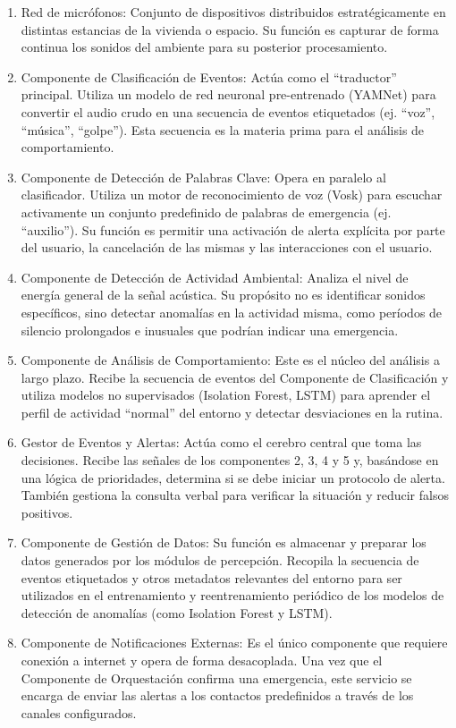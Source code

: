 \begin{enumerate}
      \item Red de micrófonos: Conjunto de dispositivos distribuidos estratégicamente en distintas estancias de la vivienda o espacio. Su función es capturar de forma continua los sonidos del ambiente para su posterior procesamiento.
      \item Componente de Clasificación de Eventos: Actúa como el ``traductor'' principal. Utiliza un modelo de red neuronal pre-entrenado (YAMNet) para convertir el audio crudo en una secuencia de eventos etiquetados (ej. ``voz'', ``música'', ``golpe''). Esta secuencia es la materia prima para el análisis de comportamiento.
      \item Componente de Detección de Palabras Clave: Opera en paralelo al clasificador. Utiliza un motor de reconocimiento de voz (Vosk) para escuchar activamente un conjunto predefinido de palabras de emergencia (ej. ``auxilio''). Su función es permitir una activación de alerta explícita por parte del usuario, la cancelación de las mismas y las interacciones con el usuario.
      \item Componente de Detección de Actividad Ambiental: Analiza el nivel de energía general de la señal acústica. Su propósito no es identificar sonidos específicos, sino detectar anomalías en la actividad misma, como períodos de silencio prolongados e inusuales que podrían indicar una emergencia.
      \item Componente de Análisis de Comportamiento: Este es el núcleo del análisis a largo plazo. Recibe la secuencia de eventos del Componente de Clasificación y utiliza modelos no supervisados (Isolation Forest, LSTM) para aprender el perfil de actividad ``normal'' del entorno y detectar desviaciones en la rutina.
      \item Gestor de Eventos y Alertas: Actúa como el cerebro central que toma las decisiones. Recibe las señales de los componentes 2, 3, 4 y 5 y, basándose en una lógica de prioridades, determina si se debe iniciar un protocolo de alerta. También gestiona la consulta verbal para verificar la situación y reducir falsos positivos.
      \item Componente de Gestión de Datos: Su función es almacenar y preparar los datos generados por los módulos de percepción. Recopila la secuencia de eventos etiquetados y otros metadatos relevantes del entorno para ser utilizados en el entrenamiento y reentrenamiento periódico de los modelos de detección de anomalías (como Isolation Forest y LSTM).
      \item Componente de Notificaciones Externas: Es el único componente que requiere conexión a internet y opera de forma desacoplada. Una vez que el Componente de Orquestación confirma una emergencia, este servicio se encarga de enviar las alertas a los contactos predefinidos a través de los canales configurados.
\end{enumerate}

